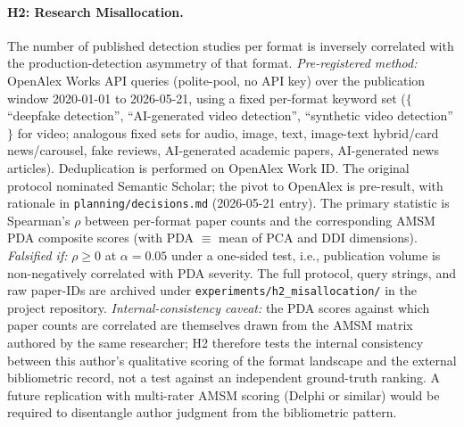 \documentclass[12pt]{article}
\begin{document}
\paragraph{H2: Research Misallocation.} The number of published detection studies per format is inversely correlated with the production-detection asymmetry of that format. \textit{Pre-registered method:} OpenAlex Works API queries (polite-pool, no API key) over the publication window 2020-01-01 to 2026-05-21, using a fixed per-format keyword set ($\{$``deepfake detection'', ``AI-generated video detection'', ``synthetic video detection''$\}$ for video; analogous fixed sets for audio, image, text, image-text hybrid/card news/carousel, fake reviews, AI-generated academic papers, AI-generated news articles). Deduplication is performed on OpenAlex Work ID. The original protocol nominated Semantic Scholar; the pivot to OpenAlex is pre-result, with rationale in \texttt{planning/decisions.md} (2026-05-21 entry). The primary statistic is Spearman's $\rho$ between per-format paper counts and the corresponding AMSM PDA composite scores (with PDA $\equiv$ mean of PCA and DDI dimensions). \textit{Falsified if:} $\rho \ge 0$ at $\alpha = 0.05$ under a one-sided test, i.e., publication volume is non-negatively correlated with PDA severity. The full protocol, query strings, and raw paper-IDs are archived under \texttt{experiments/h2\_misallocation/} in the project repository. \textit{Internal-consistency caveat:} the PDA scores against which paper counts are correlated are themselves drawn from the AMSM matrix authored by the same researcher; H2 therefore tests the internal consistency between this author's qualitative scoring of the format landscape and the external bibliometric record, not a test against an independent ground-truth ranking. A future replication with multi-rater AMSM scoring (Delphi or similar) would be required to disentangle author judgment from the bibliometric pattern.
\end{document}
